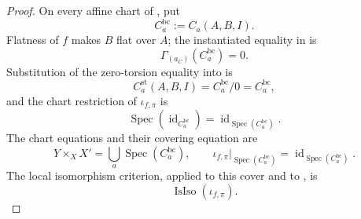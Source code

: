 \begin{proof}
  On every affine chart of
  , put
  \[
    C_a^{\mathrm{bc}}:=C_a(A,B,I).
  \]
  Flatness of $f$ makes $B$ flat over $A$; the instantiated equality in
   is
  \[
    \Gamma_{(a_C)}(C_a^{\mathrm{bc}})=0.
  \]
  Substitution of the zero-torsion equality into
   is
  \[
    C_a^{\mathrm{st}}(A,B,I)
      =C_a^{\mathrm{bc}}/0=C_a^{\mathrm{bc}},
  \]
  and the chart restriction of $\iota_{f,\pi}$ is
  \[
    \operatorname{Spec}(\operatorname{id}_{C_a^{\mathrm{bc}}})
      =\operatorname{id}_{\operatorname{Spec}(C_a^{\mathrm{bc}})}.
  \]
  The chart equations and their covering equation are
  \[
    Y\times_XX'=\bigcup_a\operatorname{Spec}(C_a^{\mathrm{bc}}),\qquad
    \iota_{f,\pi}|_{\operatorname{Spec}(C_a^{\mathrm{bc}})}
      =\operatorname{id}_{\operatorname{Spec}(C_a^{\mathrm{bc}})}.
  \]
  The local isomorphism criterion, applied to this cover and to
  , is
  \[
    \operatorname{IsIso}(\iota_{f,\pi}).
  \]
\end{proof}

